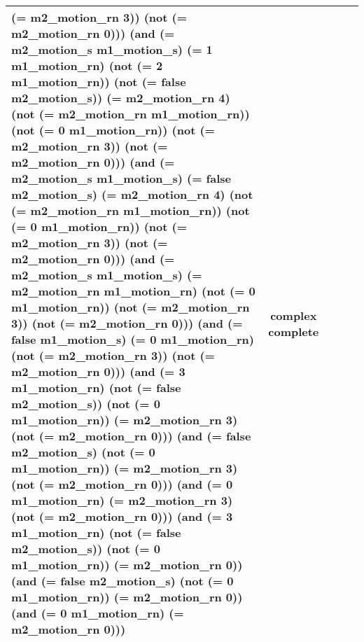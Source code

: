 \begin{table}
\begin{center}
\begin{tabular}{l|c|c|c|c}
(= m2\_motion\_rn 3)) (not (= m2\_motion\_rn 0))) (and (= m2\_motion\_s m1\_motion\_s) (= 1 m1\_motion\_rn) (not (= 2 m1\_motion\_rn)) (not (= false m2\_motion\_s)) (= m2\_motion\_rn 4) (not (= m2\_motion\_rn m1\_motion\_rn)) (not (= 0 m1\_motion\_rn)) (not (= m2\_motion\_rn 3)) (not (= m2\_motion\_rn 0))) (and (= m2\_motion\_s m1\_motion\_s) (= false m2\_motion\_s) (= m2\_motion\_rn 4) (not (= m2\_motion\_rn m1\_motion\_rn)) (not (= 0 m1\_motion\_rn)) (not (= m2\_motion\_rn 3)) (not (= m2\_motion\_rn 0))) (and (= m2\_motion\_s m1\_motion\_s) (= m2\_motion\_rn m1\_motion\_rn) (not (= 0 m1\_motion\_rn)) (not (= m2\_motion\_rn 3)) (not (= m2\_motion\_rn 0))) (and (= false m1\_motion\_s) (= 0 m1\_motion\_rn) (not (= m2\_motion\_rn 3)) (not (= m2\_motion\_rn 0))) (and (= 3 m1\_motion\_rn) (not (= false m2\_motion\_s)) (not (= 0 m1\_motion\_rn)) (= m2\_motion\_rn 3) (not (= m2\_motion\_rn 0))) (and (= false m2\_motion\_s) (not (= 0 m1\_motion\_rn)) (= m2\_motion\_rn 3) (not (= m2\_motion\_rn 0))) (and (= 0 m1\_motion\_rn) (= m2\_motion\_rn 3) (not (= m2\_motion\_rn 0))) (and (= 3 m1\_motion\_rn) (not (= false m2\_motion\_s)) (not (= 0 m1\_motion\_rn)) (= m2\_motion\_rn 0)) (and (= false m2\_motion\_s) (not (= 0 m1\_motion\_rn)) (= m2\_motion\_rn 0)) (and (= 0 m1\_motion\_rn) (= m2\_motion\_rn 0)))
} & complex complete\\
\bottomrule
\end{tabular}
\end{center}
\end{table}

